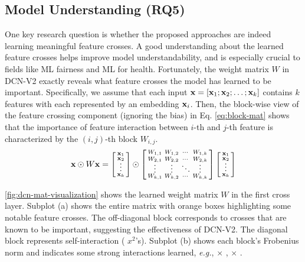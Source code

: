 \documentclass[sigconf]{acmart}
\newcommand{\vecx}{{\bf x}}
\begin{document}
\subsection{Model Understanding (RQ5)}
\label{sec:model_understanding}
One key research question is whether the proposed approaches are indeed learning meaningful feature crosses. A good understanding about the learned feature crosses helps improve model understandability, and is especially crucial to fields like ML fairness and ML for health. Fortunately, the weight matrix $W$ in {DCN-V2} exactly reveals what feature crosses the model has learned to be important. Specifically, we assume that each input $\vecx = [\vecx_1; \vecx_2; \ldots; \vecx_k]$ contains $k$ features with each represented by an embedding $\vecx_i$. Then, the block-wise view of the feature crossing component (ignoring the bias) in Eq. \eqref{eq:block-mat} shows that the importance of feature interaction between $i$-th and $j$-th feature is characterized by the $(i,j)$-th block $W_{i,j}$.
\begin{equation} \label{eq:block-mat}
    \vecx \odot W \vecx = 
    \left[\begin{smallmatrix}
        \vecx_1 \\
        \vecx_2 \vspace{-1ex}\\
        \vdots  \\
        \vecx_k
    \end{smallmatrix}\right]
    \odot
    \left[\begin{smallmatrix}
        W_{1,1} & W_{1,2} & \cdots & W_{1,k} \\
        W_{2,1} & W_{2,2} & \cdots & W_{2,k} \vspace{-1ex}\\
        \vdots  & \vdots  & \ddots & \vdots  \\
        W_{k,1} & W_{k,2} & \cdots & W_{k,k}
    \end{smallmatrix}\right]
    \left[\begin{smallmatrix}
        \vecx_1 \\
        \vecx_2 \vspace{-1ex}\\
        \vdots  \\
        \vecx_k
    \end{smallmatrix}\right]
\end{equation}

\autoref{fig:dcn-mat-visualization} shows the learned weight matrix $W$ in the first cross layer. Subplot (a) shows the entire matrix with orange boxes highlighting some notable feature crosses. The off-diagonal block corresponds to crosses that are known to be important, suggesting the effectiveness of {DCN-V2}. The diagonal block represents self-interaction ( $x^2$'s).
Subplot (b) shows each block's Frobenius norm and indicates some strong interactions learned, \emph{e.g.}, {} $\times$ {}, {} $\times$ {}.
\end{document}
